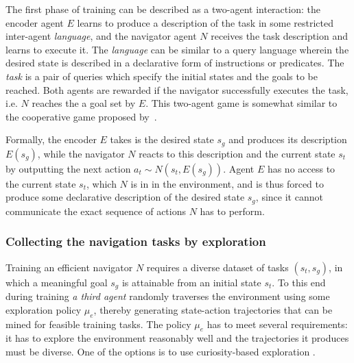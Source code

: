 \documentclass[acmsmall, nonacm]{acmart}
\begin{document}
The first phase of training can be described as a two-agent interaction: the encoder agent $E$ learns to produce a description of the task in some restricted inter-agent \emph{language}, and the navigator agent $N$ receives the task description and learns to execute it.
%
The \emph{language} can be similar to a query language wherein the desired state is described in a declarative form of instructions or predicates. The \emph{task} is a pair of queries which specify the initial states and the goals to be reached.
%
Both agents are rewarded if the navigator successfully executes the task, i.e. $N$ reaches the a goal set by $E$.
This two-agent game is somewhat similar to the cooperative game proposed by~\citet{Mordatch2018EmergenceOG}.

Formally, the encoder $E$ takes is the desired state $s_g$ and produces its description $E(s_g)$, while the navigator $N$ reacts to this description and the current state $s_t$ by outputting the next action $a_t \sim N(s_t, E(s_g))$. Agent $E$ has no access to the current state $s_t$, which $N$ is in in the environment, and is thus forced to produce some declarative description of the desired state $s_g$, since it cannot communicate the exact sequence of actions $N$ has to perform.

\subsubsection{Collecting the navigation tasks by exploration}

Training an efficient navigator $N$ requires a diverse dataset of tasks $(s_t, s_g)$, in which a meaningful goal $s_g$ is attainable from an initial state $s_t$. To this end during training \emph{a third agent} randomly traverses the environment using some exploration policy $\mu_e$, thereby generating state-action trajectories that can be mined for feasible training tasks. The policy $\mu_e$ has to meet several requirements: it has to explore the environment reasonably well and the trajectories it produces must be diverse. One of the options is to use curiosity-based exploration \citep{pathak_curiosity-driven_2017,burda_exploration_2019}.
\end{document}
